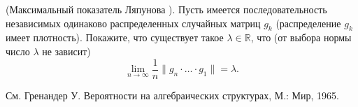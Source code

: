 %
\begin{problem}(Максимальный показатель Ляпунова \cite{27}). Пусть имеется последовательность независимых одинаково распределенных случайных матриц $g_k$ (распределение $g_k$ имеет плотность). Покажите, что существует такое $\lambda\in\mathbb{R}$, что (от выбора нормы число $\lambda$ не зависит) 
\begin{equation*}
\lim_{n\to\infty} \frac{1}{n}\|g_{n}\cdot\ldots\cdot g_{1}\| = \lambda.
\end{equation*}
\end{problem}
\begin{remark}
См. Гренандер У. Вероятности на алгебраических структурах, М.: Мир, 1965.
\end{remark}

